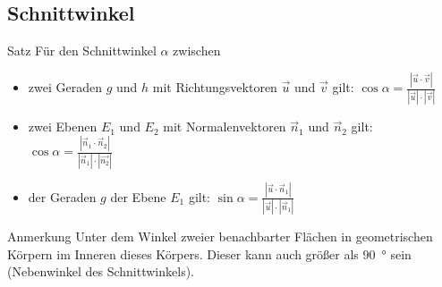 \documentclass{article}
\begin{document}
    \subsection{Schnittwinkel}
    \begin{boxx}[Red]{Satz}
        Für den  Schnittwinkel $\alpha$ zwischen
        \begin{itemize}
            \item zwei Geraden $g$ und $h$ mit Richtungsvektoren $\vec{u}$ und $\vec{v}$ gilt: $\displaystyle \cos{\alpha} = \frac{|\vec{u} \cdot \vec{v}|}{|\vec{u}|\cdot|\vec{v}|}$
            \item zwei Ebenen $E_1$ und $E_2$ mit Normalenvektoren $\vec{n}_1$ und $\vec{n}_2$ gilt: $\displaystyle \cos{\alpha} = \frac{|\vec{n}_1 \cdot \vec{n}_2|}{|\vec{n}_1|\cdot|\vec{n_2}|}$
            \item der Geraden $g$ der Ebene $E_1$ gilt: $\displaystyle \sin{\alpha} = \frac{|\vec{u} \cdot \vec{n}_1|}{|\vec{u}|\cdot|\vec{n}_1|}$
        \end{itemize}
    \end{boxx}
    \begin{boxx}[Yellow]{Anmerkung}
        Unter dem Winkel zweier benachbarter Flächen in geometrischen Körpern im
        Inneren dieses Körpers.
        Dieser kann auch größer als \qty{90}{\degree} sein (Nebenwinkel des Schnittwinkels).
    \end{boxx}
    \newpage
\end{document}
